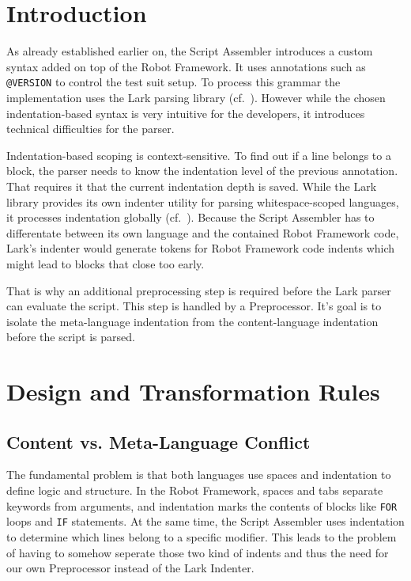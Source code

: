 \section{Introduction}

As already established earlier on, the Script Assembler introduces a custom syntax added on top of the Robot Framework. It uses annotations such as \texttt{@VERSION} to control the test suit setup. To process this grammar the implementation uses the Lark parsing library (cf.~\cite{LarkGithub}). However while the chosen indentation-based syntax is very intuitive for the developers, it introduces technical difficulties for the parser.

Indentation-based scoping is context-sensitive. To find out if a line belongs to a block, the parser needs to know the indentation level of the previous annotation. That requires it that the current indentation depth is saved. While the Lark library provides its own indenter utility for parsing whitespace-scoped languages, it processes indentation globally (cf.~\cite{LarkDocsIndent}).
Because the Script Assembler has to differentate between its own language and the contained Robot Framework code, Lark's indenter would generate tokens for Robot Framework code indents which might lead to blocks that close too early.


That is why an additional preprocessing step is required before the Lark parser can evaluate the script. This step is handled by a Preprocessor. It's goal is to isolate the meta-language indentation from the content-language indentation before the script is parsed. 

\section{Design and Transformation Rules}

\subsection{Content vs. Meta-Language Conflict}

The fundamental problem is that both languages use spaces and indentation to define logic and structure. In the Robot Framework, spaces and tabs separate keywords from arguments, and indentation marks the contents of blocks like \texttt{FOR} loops and \texttt{IF} statements. At the same time, the Script Assembler uses indentation to determine which lines belong to a specific modifier. This leads to the problem of having to somehow seperate those two kind of indents and thus the need for our own Preprocessor instead of the Lark Indenter.

